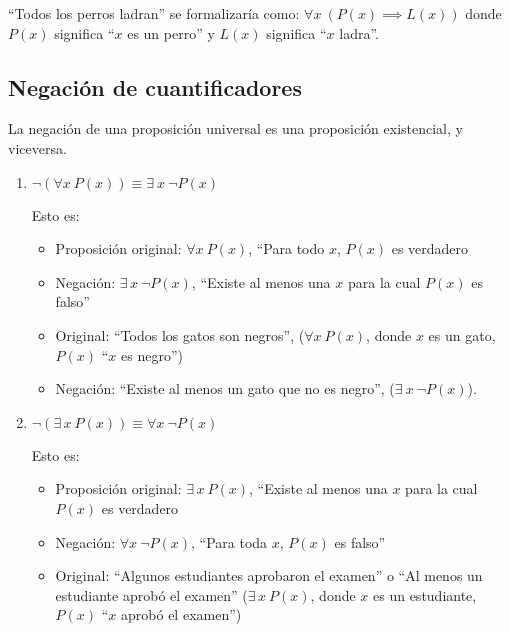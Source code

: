 \begin{fmd-example}
	``Todos los perros ladran'' se formalizaría como: $\forall x \ \left(P(x) \implies L(x)\right)$ donde $P(x)$ significa ``$x$ es un perro'' y $L(x)$ significa ``$x$ ladra''.
\end{fmd-example}

\subsection{Negación de cuantificadores}
La negación de una proposición universal es una proposición existencial, y viceversa.
\begin{enumerate}[label=\roman*)]
	\item $\neg \left( \forall x \ P(x) \right) \equiv \exists \ x \ \neg P(x)$
	
	Esto es:
	\begin{itemize}
		\item Proposición original: $\forall x \ P(x)$, ``Para todo $x$, $P(x)$ es verdadero
		\item Negación: $\exists \, x \ \neg P(x)$, ``Existe al menos una $x$ para la cual $P(x)$ es falso''
	\end{itemize}
	
	\begin{fmd-example} 
		\begin{itemize}
			\item Original: ``Todos los gatos son negros'', ($\forall x \ P(x)$, donde $x$ es un gato, $P(x)$ ``$x$ es negro'')
			\item Negación: ``Existe al menos un gato que no es negro'', ($\exists \ x \ \neg P(x)$).
		\end{itemize}
	\end{fmd-example}
	
	\item $\neg \left( \exists \, x \ P(x) \right) \equiv \forall x \ \neg P(x)$
	
	Esto es:
	\begin{itemize}
		\item Proposición original: $\exists \, x \ P(x)$, ``Existe al menos una $x$ para la cual $P(x)$ es verdadero
		\item Negación: $\forall x \ \neg P(x)$, ``Para toda $x$, $P(x)$ es falso'' 
	\end{itemize}
	
	\begin{fmd-example} 
		\begin{itemize}
		\item Original: ``Algunos estudiantes aprobaron el examen'' o ``Al menos un estudiante aprobó el examen'' ($\exists \, x \ P(x)$, donde $x$ es un estudiante, $P(x)$ ``$x$ aprobó el examen'')
		

\end{itemize}
\end{fmd-example}
\end{enumerate}
